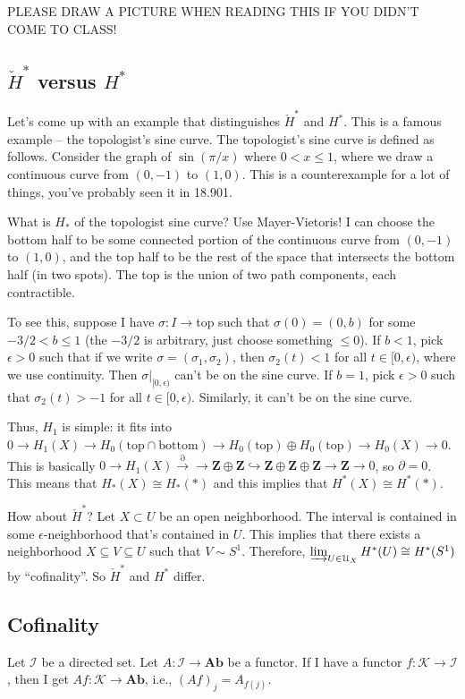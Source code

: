\documentclass{amsart}
\theoremstyle{theorem}
\theoremstyle{definition}
\def\cI{\mathscr I}\def\cJ{\mathscr J}\def\cK{\mathscr K}\def\cL{\mathscr L}
\newcommand\cHH{\check{H}}
\newcommand{\Z}{\mathbf Z}
\begin{document}
PLEASE DRAW A PICTURE WHEN READING THIS IF YOU DIDN'T COME TO CLASS!
\subsection{$\cHH^\ast$ versus $H^\ast$}
Let's come up with an example that distinguishes $\cHH^\ast$ and $H^\ast$. This is a famous example -- the topologist's sine curve. The topologist's sine curve is defined as follows. Consider the graph of $\sin(\pi/x)$ where $0<x\leq 1$, where we draw a continuous curve from $(0,-1)$ to $(1,0)$. This is a counterexample for a lot of things, you've probably seen it in 18.901.

What is $H_\ast$ of the topologist sine curve? Use Mayer-Vietoris! I can choose the bottom half to be some connected portion of the continuous curve from $(0,-1)$ to $(1,0)$, and the top half to be the rest of the space that intersects the bottom half (in two spots). The top is the union of two path components, each contractible.

To see this, suppose I have $\sigma:I\to\mathrm{top}$ such that $\sigma(0)=(0,b)$ for some $-3/2 < b\leq 1$ (the $-3/2$ is arbitrary, just choose something $\leq 0$). If $b<1$, pick $\epsilon>0$ such that if we write $\sigma=(\sigma_1,\sigma_2)$, then $\sigma_2(t)<1$ for all $t\in[0,\epsilon)$, where we use continuity. Then $\sigma|_{[0,\epsilon)}$ can't be on the sine curve. If $b=1$, pick $\epsilon>0$ such that $\sigma_2(t)>-1$ for all $t\in[0,\epsilon)$. Similarly, it can't be on the sine curve.

Thus, $H_1$ is simple: it fits into $0\to H_1(X)\to H_0(\mathrm{top}\cap\mathrm{bottom})\to H_0(\mathrm{top})\oplus H_0(\mathrm{top})\to H_0(X)\to 0$. This is basically $0\to H_1(X)\xrightarrow{\partial}\to\Z\oplus\Z\hookrightarrow\Z\oplus\Z\oplus\Z\to\Z\to 0$, so $\partial=0$. This means that $H_\ast(X)\cong H_\ast(\ast)$ and this implies that $H^\ast(X)\cong H^\ast(\ast)$.

How about $\cHH^\ast$? Let $X\subset U$ be an open neighborhood. The interval is contained in some $\epsilon$-neighborhood that's contained in $U$. This implies that there exists a neighborhood $X\subseteq V\subseteq U$ such that $V\sim S^1$. Therefore, $\varinjlim_{U\in\mathcal{U}_X}H^\ast(U)\cong H^\ast(S^1)$ by ``cofinality''. So $\cHH^\ast$ and $H^\ast$ differ.
\subsection{Cofinality}
Let $\cI$ be a directed set. Let $A:\cI\to \mathbf{Ab}$ be a functor. If I have a functor $f:\cK\to\cI$, then I get $Af:\cK\to\mathbf{Ab}$, i.e., $(Af)_j=A_{f(j)}$.
\end{document}
